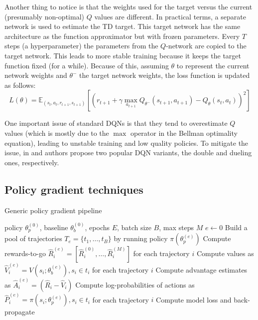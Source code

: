\documentclass{article}
\begin{document}
Another thing to notice is that the weights used for the target versus the current (presumably non-optimal) $Q$ values are different. In practical terms, a separate network is used to estimate the TD target. This target network has the same architecture as the function approximator but with frozen parameters. Every $T$ steps (a hyperparameter) the parameters from the $Q$-network are copied to the target network. This leads to more stable training because it keeps the target function fixed (for a while). Because of this, assuming $\theta$ to represent the current network weights and $\theta^{-}$ the target network weights, the loss function is updated as follows:
$$
L(\theta)=\mathbb{E}_{(s_t,a_t,r_{t+1},s_{t+1})}\left[\left(r_{t+1}+\gamma\max_{a_{t+1}}Q_{\theta^{-}}(s_{t+1}, a_{t+1}) - Q_{\theta}(s_t, a_t)\right)^2\right]
$$

One important issue of standard DQNs is that they tend to overestimate $Q$ values (which is mostly due to the $\max$ operator in the Bellman optimality equation), leading to unstable training and low quality policies. To mitigate the issue, in \cite{double-dqn} and \cite{dueling-dqn} authors propose two popular DQN variants, the double and dueling ones, respectively.

\subsection{Policy gradient techniques}

\begin{algorithm}
  \caption{Generic policy gradient pipeline}
  \begin{algorithmic}[1]
    \Require policy $\theta_p^{(0)}$, baseline $\theta_b^{(0)}$, epochs $E$, batch size $B$, max steps $M$
    \State $e \gets 0$
      \State Build a pool of trajectories $T_e=\{t_1,\dots,t_B\}$ by running policy $\pi(\theta_p^{(e)})$
      \State Compute rewards-to-go $\hat{R}_i^{(e)}=[\hat{R}_i^{(0)}, \dots, \hat{R}_i^{(M)}]$ for each trajectory $i$
      \State Compute values as $\hat{V}_i^{(e)}=V(s_i;\theta_b^{(e)}), s_i \in t_i$ for each trajectory $i$
      \State Compute advantage estimates as $\hat{A}_i^{(e)}=(\hat{R}_i-\hat{V}_i)$
      \State Compute log-probabilities of actions as $\hat{P}_i^{(e)}=\pi(s_i;\theta_p^{(e)}), s_i \in t_i$ for each trajectory $i$
      \State Compute model loss and back-propagate
    \EndWhile
  \end{algorithmic}
\end{algorithm}
\end{document}
